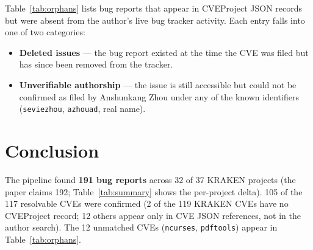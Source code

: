 \documentclass[11pt,a4paper]{article}
\begin{document}
Table~\ref{tab:orphans} lists bug reports that appear in CVEProject JSON records but were
absent from the author's live bug tracker activity. Each entry falls into one of two categories:

\begin{itemize}[nosep]
    \item \textbf{Deleted issues} --- the bug report existed at the time the CVE was filed
          but has since been removed from the tracker.
    \item \textbf{Unverifiable authorship} --- the issue is still accessible but could not
          be confirmed as filed by Anshunkang Zhou under any of the known identifiers
          (\texttt{seviezhou}, \texttt{azhouad}, real name).
\end{itemize}



\section{Conclusion}
\label{sec:conclusion}

The pipeline found \textbf{191 bug reports} across 32 of 37 KRAKEN projects
(the paper claims 192; Table~\ref{tab:summary} shows the per-project delta).
105 of the 117 resolvable CVEs were confirmed (2 of the 119 KRAKEN CVEs have no
CVEProject record; 12 others appear only in CVE JSON references, not in the author search).
The 12 unmatched CVEs (\texttt{ncurses}, \texttt{pdftools}) appear in Table~\ref{tab:orphans}.

\end{document}
